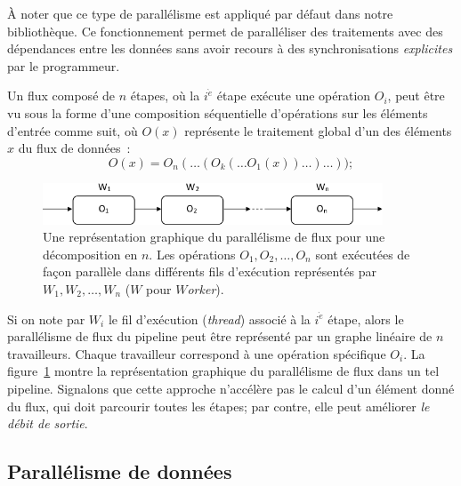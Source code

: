 \`A noter que ce type de parall\'elisme est appliqu\'e par d\'efaut dans notre biblioth\`eque. 
%
Ce fonctionnement permet de parall\'eliser des traitements avec des d\'ependances entre les donn\'ees sans avoir recours \`a des synchronisations \emph{explicites} par le programmeur. 

\goodbreak
\begin{samepage}
Un flux compos\'e de $n$ {étapes}, o\`u la $i^{\grave e}$ étape ex\'ecute une op\'eration $O_i$, peut \^etre vu sous la forme d'une composition s\'equentielle d'op\'erations sur les \'el\'ements d'entr\'ee comme suit, o\`u $O(x)$ repr\'esente le traitement global d'un des \'el\'ements $x$ du flux de données~: 
%
\[
	O(x) = O_n( \ldots (O_k( \ldots O_1(x)) \ldots ) \ldots ));
\]
\end{samepage}


\begin{figure}

\centering
     \includegraphics[width=0.9\textwidth]{Figures/ParallelismeDuFlux.png}
      \caption[Une repr\'esentation graphique du parall\'elisme de flux en \ppff.]{Une repr\'esentation graphique du parall\'elisme de flux pour une d\'ecomposition en $n$. Les op\'erations $O_1, O_2, \ldots, O_n$ sont ex\'ecut\'ees de fa\c{c}on parall\`ele dans diff\'erents fils d'ex\'ecution représentés par $W_1, W_2, \ldots, W_n$ ($W$ pour \emph{$W$orker}).}
       \label{ParallelismeDuFlux.fig}
\end{figure}


Si on note par $W_i$ le fil d'ex\'ecution (\emph{thread}) associ\'e à la $i^{\grave e}$ {étape}, alors
le parall\'elisme de flux du pipeline peut \^etre repr\'esent\'e par un graphe lin\'eaire de $n$ travailleurs. Chaque travailleur correspond \`a une op\'eration sp\'ecifique $O_i$. La figure~\ref{ParallelismeDuFlux.fig} montre la repr\'esentation graphique du parall\'elisme de flux dans un tel pipeline. Signalons que cette approche n'acc\'el\`ere pas le calcul d'un \'el\'ement donné du flux, qui doit parcourir toutes les étapes; par contre, elle peut am\'eliorer \emph{le d\'ebit de sortie}.

\subsection{Parall\'elisme de donn\'ees}
\label{ParallelismeDeDonnees.sect}

